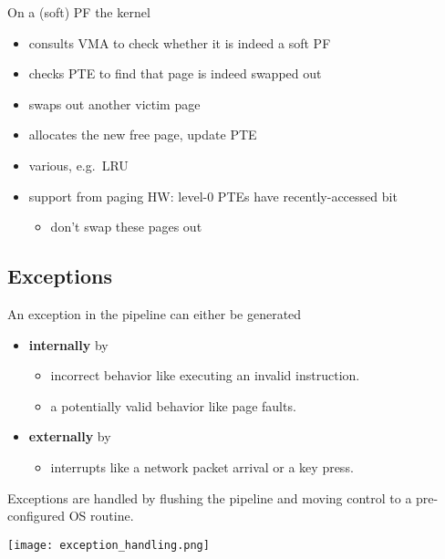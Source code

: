 \newpar{}

On a (soft) PF the kernel
\begin{itemize}
    \item consults VMA to check whether it is indeed a soft PF
    \item checks PTE to find that page is indeed swapped out
    \item swaps out another victim page
    \item allocates the new free page, update PTE
\end{itemize}

\newpar{}

\begin{itemize}
    \item various, e.g.\ LRU
    \item support from paging HW: level-0 PTEs have recently-accessed bit
          \begin{itemize}
              \item don't swap these pages out
          \end{itemize}
\end{itemize}

\subsection{Exceptions}\label{exceptions}
An exception in the pipeline can either be generated
\begin{itemize}
    \item \textbf{internally} by
          \begin{itemize}
              \item incorrect behavior like executing an invalid instruction.
              \item a potentially valid behavior like page faults.
          \end{itemize}
    \item \textbf{externally} by
          \begin{itemize}
              \item interrupts like a network packet arrival or a key press.
          \end{itemize}
\end{itemize}

Exceptions are handled by flushing the pipeline and moving control to a pre-configured OS routine.

\begin{center}
    \texttt{[image: exception\_handling.png]}
\end{center}

